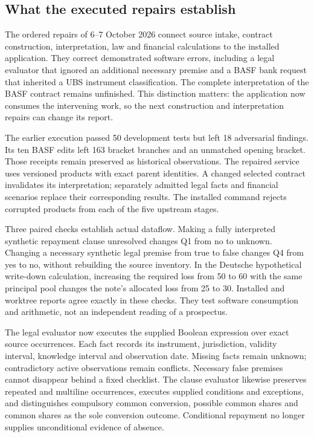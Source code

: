 \subsection{What the executed repairs establish}
\label{sec:prospectus-executed}

The ordered repairs of 6--7 October 2026 connect source intake, contract
construction, interpretation, law and financial calculations to the installed
application. They correct demonstrated software errors, including a legal
evaluator that ignored an additional necessary premise and a BASF bank request
that inherited a UBS instrument classification. The complete interpretation of
the BASF contract remains unfinished. This distinction matters: the application
now consumes the intervening work, so the next construction and interpretation
repairs can change its report.

The earlier execution passed 50 development tests but left 18 adversarial
findings. Its ten BASF edits left 163 bracket branches and an unmatched opening
bracket. Those receipts remain preserved as historical observations. The repaired
service uses versioned products with exact parent identities. A changed selected
contract invalidates its interpretation; separately admitted legal facts and
financial scenarios replace their corresponding results. The installed command
rejects corrupted products from each of the five upstream stages.

Three paired checks establish actual dataflow. Making a fully interpreted
synthetic repayment clause unresolved changes Q1 from no to unknown. Changing
a necessary synthetic legal premise from true to false changes Q4 from yes to
no, without rebuilding the source inventory. In the Deutsche hypothetical
write-down calculation, increasing the required loss from 50 to 60 with the
same principal pool changes the note's allocated loss from 25 to 30.
Installed and worktree reports agree exactly in these checks. They test software
consumption and arithmetic, not an independent reading of a prospectus.

The legal evaluator now executes the supplied Boolean expression over exact
source occurrences. Each fact records its instrument, jurisdiction, validity
interval, knowledge interval and observation date. Missing facts remain unknown;
contradictory active observations remain conflicts. Necessary false premises
cannot disappear behind a fixed checklist. The clause evaluator likewise
preserves repeated and multiline occurrences, executes supplied conditions and
exceptions, and distinguishes compulsory common conversion, possible common
shares and common shares as the sole conversion outcome. Conditional repayment
no longer supplies unconditional evidence of absence.

